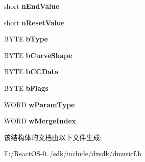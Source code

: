 \begin{DoxyCompactItemize}
short {\bfseries n\+End\+Value}
\item 
\mbox{\label{struct___d_m_u_s___i_o___c_u_r_v_e___i_t_e_m_a8a1b077d00d3ae6d920698bc466c153c}} 
short {\bfseries n\+Reset\+Value}
\item 
\mbox{\label{struct___d_m_u_s___i_o___c_u_r_v_e___i_t_e_m_a416780d2d72030c7c534e9a7c1439c0f}} 
B\+Y\+TE {\bfseries b\+Type}
\item 
\mbox{\label{struct___d_m_u_s___i_o___c_u_r_v_e___i_t_e_m_ab234ae31c8df1b2bf6186e112e1daa98}} 
B\+Y\+TE {\bfseries b\+Curve\+Shape}
\item 
\mbox{\label{struct___d_m_u_s___i_o___c_u_r_v_e___i_t_e_m_afbaa571719a7cd24438b3b054fad1d0e}} 
B\+Y\+TE {\bfseries b\+C\+C\+Data}
\item 
\mbox{\label{struct___d_m_u_s___i_o___c_u_r_v_e___i_t_e_m_ab5fe0172932868e96189fdf0e9c7bcb7}} 
B\+Y\+TE {\bfseries b\+Flags}
\item 
\mbox{\label{struct___d_m_u_s___i_o___c_u_r_v_e___i_t_e_m_a50a9d86ea60e400f1d7264aecb4ada96}} 
W\+O\+RD {\bfseries w\+Param\+Type}
\item 
\mbox{\label{struct___d_m_u_s___i_o___c_u_r_v_e___i_t_e_m_a2dfe18e9d8c722ae04982252000073b3}} 
W\+O\+RD {\bfseries w\+Merge\+Index}
\end{DoxyCompactItemize}


该结构体的文档由以下文件生成\+:\begin{DoxyCompactItemize}
\item 
E\+:/\+React\+O\+S-\/0../sdk/include/dxsdk/dmusicf.\+h\end{DoxyCompactItemize}
